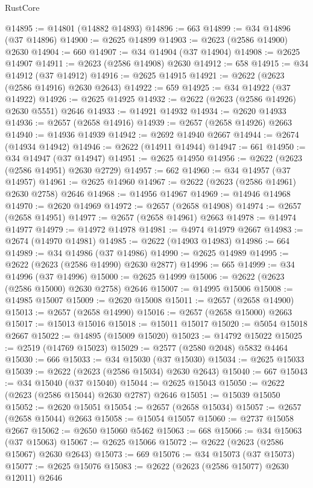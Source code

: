 \begin{lexlean}{RustCore}
\begin{coremodule}
@14895 := @14801 (@14882 @14893)
@14896 := 663
@14899 := @34 @14896 (@37 @14896)
@14900 := @2625 @14899
@14903 := @2623 (@2586 @14900) @2630
@14904 := 660
@14907 := @34 @14904 (@37 @14904)
@14908 := @2625 @14907
@14911 := @2623 (@2586 @14908) @2630
@14912 := 658
@14915 := @34 @14912 (@37 @14912)
@14916 := @2625 @14915
@14921 := @2622 (@2623 (@2586 @14916) @2630 @2643)
@14922 := 659
@14925 := @34 @14922 (@37 @14922)
@14926 := @2625 @14925
@14932 := @2622 (@2623 (@2586 @14926) @2630 @5551) @2646
@14933 := @14921 @14932
@14934 := @2620 @14933
@14936 := @2657 (@2658 @14916)
@14939 := @2657 (@2658 @14926) @2663
@14940 := @14936 @14939
@14942 := @2692 @14940 @2667
@14944 := @2674 (@14934 @14942)
@14946 := @2622 (@14911 @14944)
@14947 := 661
@14950 := @34 @14947 (@37 @14947)
@14951 := @2625 @14950
@14956 := @2622 (@2623 (@2586 @14951) @2630 @2729)
@14957 := 662
@14960 := @34 @14957 (@37 @14957)
@14961 := @2625 @14960
@14967 := @2622 (@2623 (@2586 @14961) @2630 @2758) @2646
@14968 := @14956 @14967
@14969 := @14946 @14968
@14970 := @2620 @14969
@14972 := @2657 (@2658 @14908)
@14974 := @2657 (@2658 @14951)
@14977 := @2657 (@2658 @14961) @2663
@14978 := @14974 @14977
@14979 := @14972 @14978
@14981 := @4974 @14979 @2667
@14983 := @2674 (@14970 @14981)
@14985 := @2622 (@14903 @14983)
@14986 := 664
@14989 := @34 @14986 (@37 @14986)
@14990 := @2625 @14989
@14995 := @2622 (@2623 (@2586 @14990) @2630 @2877)
@14996 := 665
@14999 := @34 @14996 (@37 @14996)
@15000 := @2625 @14999
@15006 := @2622 (@2623 (@2586 @15000) @2630 @2758) @2646
@15007 := @14995 @15006
@15008 := @14985 @15007
@15009 := @2620 @15008
@15011 := @2657 (@2658 @14900)
@15013 := @2657 (@2658 @14990)
@15016 := @2657 (@2658 @15000) @2663
@15017 := @15013 @15016
@15018 := @15011 @15017
@15020 := @5054 @15018 @2667
@15022 := @14895 (@15009 @15020)
@15023 := @14792 @15022
@15025 := @2519 (@14769 @15023)
@15029 := @2577 (@2580 @2048) @5832 @4464
@15030 := 666
@15033 := @34 @15030 (@37 @15030)
@15034 := @2625 @15033
@15039 := @2622 (@2623 (@2586 @15034) @2630 @2643)
@15040 := 667
@15043 := @34 @15040 (@37 @15040)
@15044 := @2625 @15043
@15050 := @2622 (@2623 (@2586 @15044) @2630 @2787) @2646
@15051 := @15039 @15050
@15052 := @2620 @15051
@15054 := @2657 (@2658 @15034)
@15057 := @2657 (@2658 @15044) @2663
@15058 := @15054 @15057
@15060 := @2737 @15058 @2667
@15062 := @2650 @15060 @5462
@15063 := 668
@15066 := @34 @15063 (@37 @15063)
@15067 := @2625 @15066
@15072 := @2622 (@2623 (@2586 @15067) @2630 @2643)
@15073 := 669
@15076 := @34 @15073 (@37 @15073)
@15077 := @2625 @15076
@15083 := @2622 (@2623 (@2586 @15077) @2630 @12011) @2646

\end{coremodule}
\end{lexlean}
